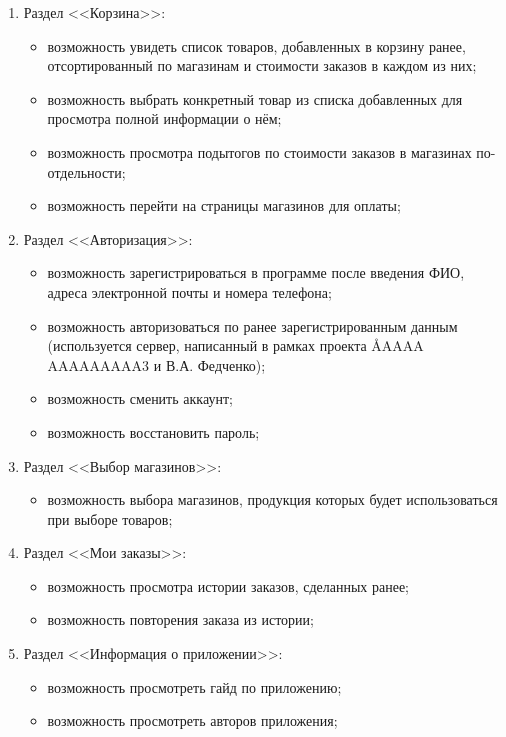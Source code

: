 \documentclass[a4paper,12pt,reqno]{article}
\begin{document}
\begin{enumerate}
    \item Раздел <<Корзина>>:
    \begin{itemize}
      \item возможность увидеть список товаров, добавленных в корзину ранее, отсортированный по магазинам и стоимости заказов в каждом из них;
      \item возможность выбрать конкретный товар из списка добавленных для просмотра полной информации о нём;
      \item возможность просмотра подытогов по стоимости заказов в магазинах по-отдельности;
      \item возможность перейти на страницы магазинов для оплаты;
    \end{itemize}
    \item Раздел <<Авторизация>>:
    \begin{itemize}
      \item возможность зарегистрироваться в программе после введения ФИО, адреса электронной почты и номера телефона;
      \item возможность авторизоваться по ранее зарегистрированным данным (используется сервер, написанный в рамках проекта \AA{AAAA AAAAAAAAA}{3} и В.А. Федченко);
      \item возможность сменить аккаунт;
      \item возможность восстановить пароль;
    \end{itemize}
    \item Раздел <<Выбор магазинов>>:
    \begin{itemize}
      \item возможность выбора магазинов, продукция которых будет использоваться при выборе товаров;
    \end{itemize}
    \item Раздел <<Мои заказы>>:
    \begin{itemize}
      \item возможность просмотра истории заказов, сделанных ранее;
      \item возможность повторения заказа из истории;
    \end{itemize}
    \item Раздел <<Информация о приложении>>:
    \begin{itemize}
      \item возможность просмотреть гайд по приложению;
      \item возможность просмотреть авторов приложения;
    \end{itemize}
  \end{enumerate}
\end{document}
